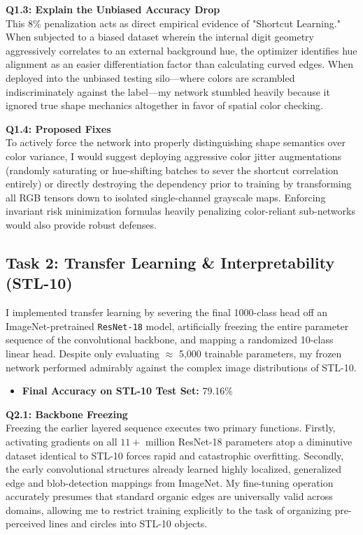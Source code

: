 \documentclass[12pt,a4paper]{article}
\begin{document}
\textbf{Q1.3: Explain the Unbiased Accuracy Drop}\\
This 8\% penalization acts as direct empirical evidence of "Shortcut Learning." When subjected to a biased dataset wherein the internal digit geometry aggressively correlates to an external background hue, the optimizer identifies hue alignment as an easier differentiation factor than calculating curved edges. When deployed into the unbiased testing silo—where colors are scrambled indiscriminately against the label—my network stumbled heavily because it ignored true shape mechanics altogether in favor of spatial color checking.

\textbf{Q1.4: Proposed Fixes}\\
To actively force the network into properly distinguishing shape semantics over color variance, I would suggest deploying aggressive color jitter augmentations (randomly saturating or hue-shifting batches to sever the shortcut correlation entirely) or directly destroying the dependency prior to training by transforming all RGB tensors down to isolated single-channel grayscale maps. Enforcing invariant risk minimization formulas heavily penalizing color-reliant sub-networks would also provide robust defenses.

\subsection*{Task 2: Transfer Learning \& Interpretability (STL-10)}
I implemented transfer learning by severing the final 1000-class head off an ImageNet-pretrained \texttt{ResNet-18} model, artificially freezing the entire parameter sequence of the convolutional backbone, and mapping a randomized 10-class linear head. Despite only evaluating $\approx$ 5,000 trainable parameters, my frozen network performed admirably against the complex image distributions of STL-10.
\begin{itemize}
    \item \textbf{Final Accuracy on STL-10 Test Set:} 79.16\%
\end{itemize}

\textbf{Q2.1: Backbone Freezing}\\
Freezing the earlier layered sequence executes two primary functions. Firstly, activating gradients on all $11+$ million ResNet-18 parameters atop a diminutive dataset identical to STL-10 forces rapid and catastrophic overfitting. Secondly, the early convolutional structures already learned highly localized, generalized edge and blob-detection mappings from ImageNet. My fine-tuning operation accurately presumes that standard organic edges are universally valid across domains, allowing me to restrict training explicitly to the task of organizing pre-perceived lines and circles into STL-10 objects.
\end{document}
